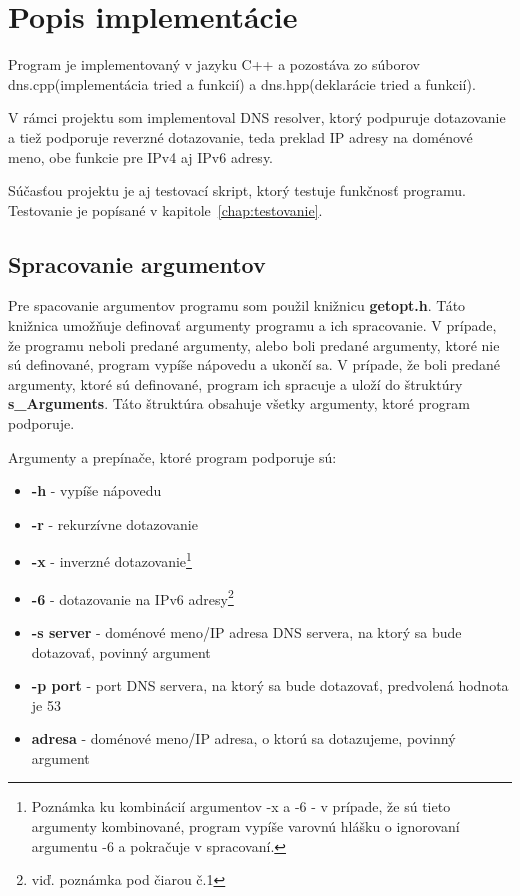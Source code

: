 \chapter{Popis implementácie}
Program je implementovaný v jazyku C++ a pozostáva zo súborov dns.cpp(implementácia tried a funkcií) a dns.hpp(deklarácie tried a funkcií).

V rámci projektu som implementoval DNS resolver, ktorý podpuruje dotazovanie a tiež podporuje reverzné dotazovanie, teda preklad IP adresy na doménové meno, obe funkcie pre IPv4 aj IPv6 adresy.

Súčasťou projektu je aj testovací skript, ktorý testuje funkčnosť programu. Testovanie je popísané v kapitole~\ref{chap:testovanie}.

\section{Spracovanie argumentov}\label{sec:argumenty}
Pre spacovanie argumentov programu som použil knižnicu \textbf{getopt.h}. Táto knižnica umožňuje definovať argumenty programu a ich spracovanie. V prípade, že programu neboli predané argumenty, alebo boli predané argumenty, ktoré nie sú definované, program vypíše nápovedu a ukončí sa. V prípade, že boli predané argumenty, ktoré sú definované, program ich spracuje a uloží do štruktúry \textbf{s\_Arguments}. Táto štruktúra obsahuje všetky argumenty, ktoré program podporuje.

\noindent Argumenty a prepínače, ktoré program podporuje sú:
\begin{itemize}
    \item \textbf{-h} - vypíše nápovedu
    \item \textbf{-r} - rekurzívne dotazovanie
    \item \textbf{-x} - inverzné dotazovanie\footnote{Poznámka ku kombinácií argumentov -x a -6 - v prípade, že sú tieto argumenty kombinované, program vypíše varovnú hlášku o ignorovaní argumentu -6 a pokračuje v spracovaní.}
    \item \textbf{-6} - dotazovanie na IPv6 adresy\footnote{viď. poznámka pod čiarou č.1}
    \item \textbf{-s server} - doménové meno/IP adresa DNS servera, na ktorý sa bude dotazovať, povinný argument
    \item \textbf{-p port} - port DNS servera, na ktorý sa bude dotazovať, predvolená hodnota je 53
    \item \textbf{adresa} - doménové meno/IP adresa, o ktorú sa dotazujeme, povinný argument
\end{itemize}

